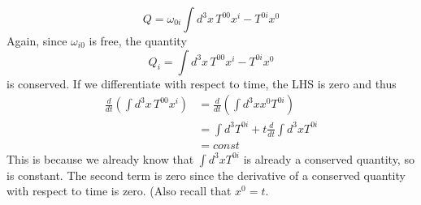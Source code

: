 \[ 
Q = \omega_{ 0i} \int d^3 x \, T^{ 00} x^i - T^{ 0i }x^0 
\] 
Again, since $\omega_{ i0} $ is free, the quantity 
\[ 
Q_i = \int d^3 x \, T^{ 00} x^i - T^{ 0i }x^0 
\]
is conserved. If we differentiate with respect to time, the LHS is zero and thus 
\begin{align*} 
\frac{d}{ dt} \left( \int d^3 x \, T^{ 00} x^i \right) &= \frac{ d}{ dt } \left( \int d^3 x x^0 T^{ 0i } \right) \\
& = \int d^3 T^{ 0i } + t \frac{d}{ dt } \int d^3 x T^{0i} \\
& = const
\end{align*} 
This is because we already know that $\int d^3 x T^{ 0i  } $ is already a conserved quantity, so is constant. The second term is zero since the derivative of a conserved quantity with respect to time is zero. (Also recall that $x^0 = t $. 
\pagebreak 
